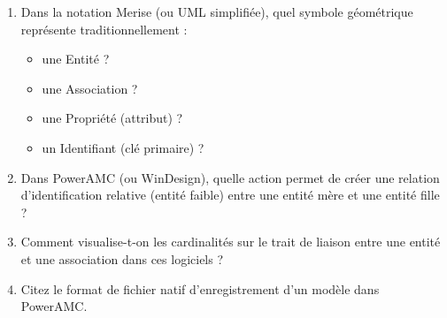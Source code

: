\documentclass[11pt]{article}
\begin{document}
\begin{exercice}
\begin{enumerate}
    \item Dans la notation Merise (ou UML simplifiée), quel symbole géométrique représente traditionnellement :
    \begin{itemize}
        \item une Entité ?
        \item une Association ?
        \item une Propriété (attribut) ?
        \item un Identifiant (clé primaire) ?
    \end{itemize}
    \item Dans PowerAMC (ou WinDesign), quelle action permet de créer une relation d'identification relative (entité faible) entre une entité mère et une entité fille ?
    \item Comment visualise-t-on les cardinalités sur le trait de liaison entre une entité et une association dans ces logiciels ?
    \item Citez le format de fichier natif d'enregistrement d'un modèle dans PowerAMC.
\end{enumerate}
\end{exercice}
\end{document}
